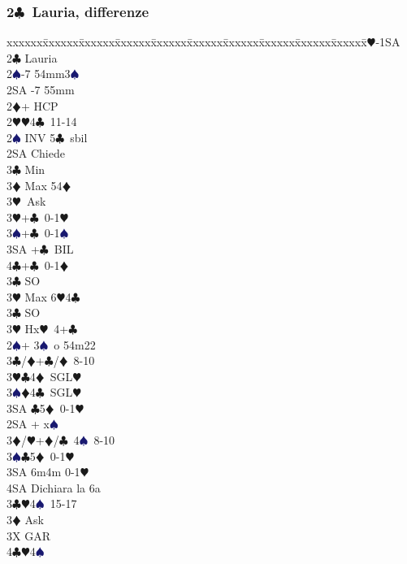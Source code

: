 \documentclass[a4paper,italian]{article}
\newcommand{\BC}{\textcolor{OliveGreen}{$\clubsuit$}}
\newcommand{\BD}{\textcolor{RedOrange}{$\vardiamondsuit$}}
\newcommand{\BH}{\textcolor{Red2}{$\varheartsuit${}}}
\newcommand{\BS}{\textcolor{MidnightBlue}{$\spadesuit${}}}
\newcommand{\pdfc}{\texorpdfstring{\BC{}}{C}}
\newenvironment{bidtable}
{\begin{tabbing}

    xxxxxx\=xxxxxx\=xxxxxx\=xxxxxx\=xxxxxx\=xxxxxx\=xxxxxx\=xxxxxx\=xxxxxx\=xxxxxx\=\kill}
{\end{tabbing} }%
\begin{document}
\begin{multicols}{2}

    \subsubsection{2\pdfc\ Lauria, differenze}\label{Lauriadiff}

    \begin{bidtable}
        1\BH-1SA\+\\
        2\BC \> Lauria\+\\
        2\BS {}-7 54mm3\BS \\
        2SA -7 55mm\\
        2\BD {}+ HCP\+\\
        2\BH {}\BH 4\BC\ 11-14\+\\
        2\BS \> INV 5\BC\ sbil\+\\
        2SA \> Chiede\+\\
        3\BC \> Min\\
        3\BD \> Max 54\BD\+\\
        3\BH\ Ask\-\\
        3\BH {}+\BC\ 0-1\BH\\
        3\BS {}+\BC\ 0-1\BS\\
        3SA +\BC\ BIL\\
        4\BC {}+\BC\ 0-1\BD\-\\
        3\BC \> SO\\
        3\BH \> Max 6\BH4\BC\-\\
        3\BC \> SO\\
        3\BH \> Hx\BH\ 4+\BC \-\\
        2\BS {}+ 3\BS\ o 54m22\+\\
        3\BC/\BD {}+\BC /\BD\ 8-10\\
        3\BH {}\BC 4\BD\ SGL\BH \\
        3\BS {}\BD 4\BC\ SGL\BH \\
        3SA \BC 5\BD\ 0-1\BH \-\\
        2SA + x\BS \+\\
        3\BD/\BH {}+\BD /\BC\ 4\BS\ 8-10\\
        3\BS {}\BC 5\BD\ 0-1\BH \\
        3SA \> 6m4m 0-1\BH \+\\
        4SA \> Dichiara la 6a\-\-\\
        3\BC {}\BH 4\BS\ 15-17\+\\
        3\BD \> Ask\+\\
        3X \> GAR\\
        4\BC {}\BH 4\BS \-\-\-\-\-
    \end{bidtable}


\end{multicols}
\end{document}
